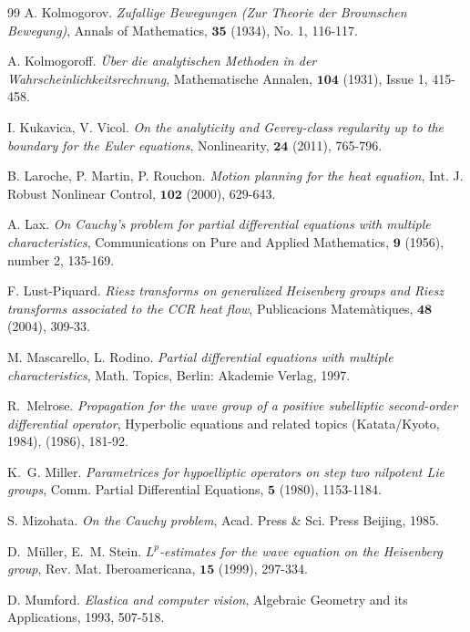 \documentclass[12pt,oneside,a4paper]{book}
\numberwithin{equation}{section}     %
\theoremstyle{plain}
\theoremstyle{definition}
\begin{document}
\begin{thebibliography}{99}
	A. Kolmogorov.
	\emph{Zufallige Bewegungen (Zur Theorie der Brownschen Bewegung)}, 
	Annals of Mathematics, $\mathbf{35}$ {(1934)}, No. 1, 116-117.
	
	A. Kolmogoroff.
	\emph{\"Uber die analytischen Methoden in der Wahrscheinlichkeitsrechnung},
	Mathematische Annalen, $\mathbf{104}$ {(1931)}, Issue 1, 415-458.
	
	I. Kukavica, V. Vicol.
	\emph{On the analyticity and Gevrey-class regularity up to the boundary for the Euler equations},
	Nonlinearity, $\mathbf{24}$ (2011), 765-796.
	
	B. Laroche, P. Martin, P. Rouchon.
	\emph{Motion planning for the heat equation},
	Int. J. Robust Nonlinear Control, $\mathbf{102}$ (2000), 629-643.
	
	A. Lax.
	\emph{On Cauchy's problem for partial differential equations with multiple characteristics},
	Communications on Pure and Applied Mathematics, $\mathbf{9}$ (1956), number 2, 135-169.
	
	F. Lust-Piquard. 
	\emph{Riesz transforms on generalized Heisenberg groups and Riesz transforms associated to the CCR heat flow}, 
	Publicacions Matemàtiques, $\mathbf{48}$ (2004), 309-33.
	
	M. Mascarello, L. Rodino.
	\emph{Partial differential equations with multiple characteristics},
	Math. Topics, Berlin: Akademie Verlag, 1997.
	
	R.~Melrose.
	\emph{Propagation for the wave group of a positive subelliptic second-order differential operator},
	Hyperbolic equations and related topics (Katata/Kyoto, 1984), (1986), 181-92.
	
	K.~G. Miller.
	\emph{Parametrices for hypoelliptic operators on step two nilpotent Lie groups},
	Comm. Partial Differential Equations, $\mathbf{5}$ (1980), 1153-1184.
	
	S. Mizohata.
	\emph{On the Cauchy problem}, 
	Acad. Press \& Sci. Press Beijing, 1985. 
	
	D.~M{{\"u}}ller, E.~M. Stein.
	\emph{{$L^p$}-estimates for the wave equation on the {H}eisenberg group},
	Rev. Mat. Iberoamericana, $\mathbf{15}$ (1999), 297-334.
	
	D. Mumford.
	\emph{Elastica and computer vision},
	Algebraic Geometry and its Applications, 1993, 507-518.
	

\end{thebibliography}
\end{document}
